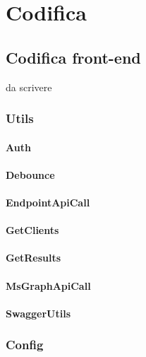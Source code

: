 
\section{Codifica}
\subsection{Codifica front-end}\label{subsec:codifica-front-end}
da scrivere

\subsubsection{Utils}\label{subsubsec:utils}
\paragraph{Auth}\label{par:auth-utils}
\paragraph{Debounce}\label{par:debounce}
\paragraph{EndpointApiCall}\label{par:endpoint-api-call}
\paragraph{GetClients}\label{par:get-clients}
\paragraph{GetResults}\label{par:get-results}
\paragraph{MsGraphApiCall}\label{par:ms-graph-api-call}
\paragraph{SwaggerUtils}\label{par:swagger-utils}


\subsubsection{Config}\label{subsubsec:config}
